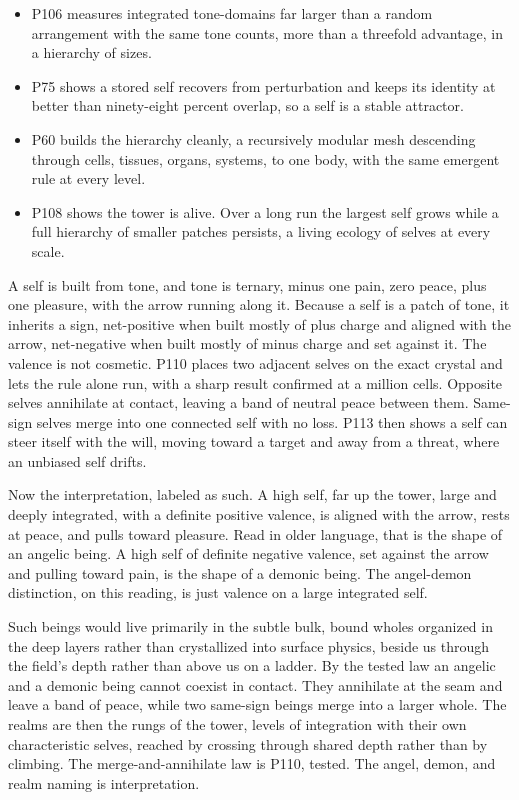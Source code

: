 \begin{itemize}
\item P106 measures integrated tone-domains far larger than a random arrangement with the same tone counts, more than a threefold advantage, in a hierarchy of sizes.
\item P75 shows a stored self recovers from perturbation and keeps its identity at better than ninety-eight percent overlap, so a self is a stable attractor.
\item P60 builds the hierarchy cleanly, a recursively modular mesh descending through cells, tissues, organs, systems, to one body, with the same emergent rule at every level.
\item P108 shows the tower is alive. Over a long run the largest self grows while a full hierarchy of smaller patches persists, a living ecology of selves at every scale.
\end{itemize}

A self is built from tone, and tone is ternary, minus one pain, zero peace, plus one pleasure, with the arrow running along it. Because a self is a patch of tone, it inherits a sign, net-positive when built mostly of plus charge and aligned with the arrow, net-negative when built mostly of minus charge and set against it. The valence is not cosmetic. P110 places two adjacent selves on the exact crystal and lets the rule alone run, with a sharp result confirmed at a million cells. Opposite selves annihilate at contact, leaving a band of neutral peace between them. Same-sign selves merge into one connected self with no loss. P113 then shows a self can steer itself with the will, moving toward a target and away from a threat, where an unbiased self drifts.

Now the interpretation, labeled as such. A high self, far up the tower, large and deeply integrated, with a definite positive valence, is aligned with the arrow, rests at peace, and pulls toward pleasure. Read in older language, that is the shape of an angelic being. A high self of definite negative valence, set against the arrow and pulling toward pain, is the shape of a demonic being. The angel-demon distinction, on this reading, is just valence on a large integrated self.

Such beings would live primarily in the subtle bulk, bound wholes organized in the deep layers rather than crystallized into surface physics, beside us through the field's depth rather than above us on a ladder. By the tested law an angelic and a demonic being cannot coexist in contact. They annihilate at the seam and leave a band of peace, while two same-sign beings merge into a larger whole. The realms are then the rungs of the tower, levels of integration with their own characteristic selves, reached by crossing through shared depth rather than by climbing. The merge-and-annihilate law is P110, tested. The angel, demon, and realm naming is interpretation.

